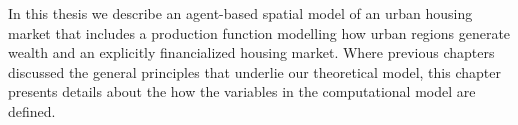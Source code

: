 






In this thesis  we describe an agent-based spatial model of an urban housing market that includes a production function modelling how urban regions generate wealth and an explicitly financialized housing market.  Where previous chapters %
discussed the general principles that underlie our theoretical model, this chapter presents details about the how the variables in the computational model are defined. %

